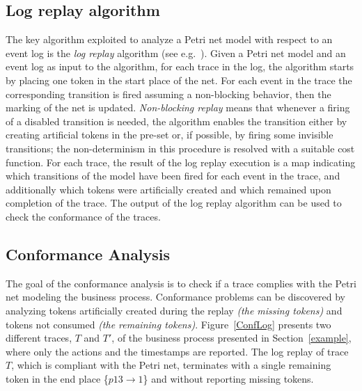 \documentclass{llncs}
\begin{document}
\subsection{Log replay algorithm}\label{logreplayAlg}
The key algorithm exploited to analyze a Petri net model with respect to an event log is the {\itshape log replay} algorithm (see e.g.~\cite{DBLP:journals/is/RozinatA08}).
Given a Petri net model and an event log as input to the algorithm, for each trace in the log, the algorithm starts by placing one token in the start place of the net. For each event in the trace the corresponding transition is fired assuming a  non-blocking behavior, then the marking of the net is updated. \emph{Non-blocking replay} means that whenever a firing of a disabled transition is needed, the algorithm enables the transition either by creating artificial tokens in the pre-set or, if possible, by firing some invisible transitions; the non-determinism in this procedure is resolved with a suitable cost function. For each trace, the result of the log replay execution is a map indicating which transitions of the model have been fired for each event in the trace, and additionally which tokens were artificially created and which remained  upon completion of the trace.
The output of the log replay algorithm  can be used to check the conformance of the traces.


\subsection{Conformance Analysis}\label{ConformanceAnalysis}
The goal of the conformance analysis is to check if a trace complies with the Petri net modeling the business process. Conformance problems can be discovered by analyzing tokens artificially created during the replay {\itshape (the missing tokens)} and tokens not consumed {\itshape (the remaining tokens)}. Figure~\ref{ConfLog}  presents two different traces, $T$ and $T'$, of the business process presented in Section~\ref{example}, where only the actions and the timestamps are reported. The log replay of trace $T$, which is compliant with the Petri net, terminates with a single remaining  
token in the end place \{${p13 \rightarrow 1}$\} and without reporting  missing tokens.
\end{document}
